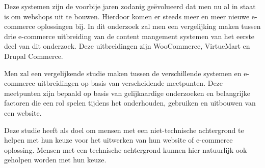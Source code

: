 Deze systemen zijn de voorbije jaren zodanig geëvolueerd dat men nu al in staat is om webshops uit te bouwen. Hierdoor komen er steeds meer en meer nieuwe e-commerce oplossingen bij. In dit onderzoek zal men een vergelijking maken tussen drie e-commerce uitbreiding van de content mangement systemen van het eerste deel van dit onderzoek. Deze uitbreidingen zijn WooCommerce, VirtueMart en Drupal Commerce.

Men zal een vergelijkende studie maken tussen de verschillende systemen en e-commerce uitbreidingen op basis van verscheidende meetpunten. Deze meetpunten zijn bepaald op basis van gelijkaardige onderzoeken en belangrijke factoren die een rol spelen tijdens het onderhouden, gebruiken en uitbouwen van een website.

Deze studie heeft als doel om mensen met een niet-technische achtergrond te helpen met hun keuze voor het uitwerken van hun website of e-commerce oplossing. Mensen met een technische achtergrond kunnen hier natuurlijk ook geholpen worden met hun keuze.